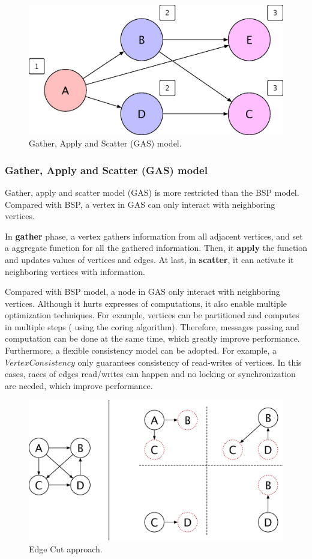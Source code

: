 \begin{figure}[tbh]
  \center
  \includegraphics[width=.8\linewidth]{figures/gas}
  \caption{Gather, Apply and Scatter (GAS) model.}
  \label{fig:gas}
\end{figure}

\subsubsection{Gather, Apply and Scatter (GAS) model}
Gather, apply and scatter model (GAS) is more restricted than the BSP model.
Compared with BSP, a vertex in GAS can only interact with neighboring
vertices.

In \textbf{gather} phase, a vertex gathers information from all adjacent vertices, and
set a aggregate function for all the gathered information. Then, it \textbf{apply}
the function and updates values of vertices and edges. At last, in \textbf{scatter},
it can activate it neighboring vertices with information.

Compared with BSP model, a node in GAS only interact with neighboring
vertices. Although it hurts expresses of computations, it also
enable multiple optimization techniques. For example, vertices can
be partitioned and computes in multiple steps (\eg{} using the coring
algorithm). Therefore,
messages passing and computation can be done at the same time, which
greatly improve performance.
Furthermore, a flexible consistency model can be adopted. For example,
a $Vertex Consistency$ only guarantees consistency of read-writes
of vertices. In this cases, races of edges read/writes can happen
and no locking or synchronization are needed, which improve performance.


\begin{figure}
  \center
  \includegraphics[width=.8\linewidth]{figures/edgecut}
  \caption{Edge Cut approach.}
  \label{fig:edgecut}
\end{figure}

